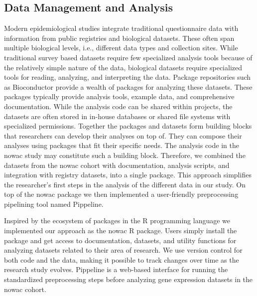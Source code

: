 \subsection{Data Management and Analysis} 
Modern epidemiological studies integrate traditional questionnaire data with
information from public registries and biological datasets. These often span
multiple biological levels, i.e., different data types and collection sites.
While traditional survey based datasets require few specialized analysis tools
because of the relatively simple nature of the data, biological datasets require
specialized tools for reading, analyzing, and interpreting the data. Package
repositories such as Bioconductor\cite{bioconductor} provide a wealth of
packages for analyzing these datasets. These packages typically provide analysis
tools, example data, and comprehensive documentation. While the analysis code
can be shared within projects, the datasets are often stored in in-house
databases or shared file systems with specialized permissions. Together the
packages and datasets form building blocks that researchers can develop their
analyses on top of. They can compose their analyses using packages that fit
their specific needs. The analysis code in the \gls{nowac} study may constitute
such a building block. Therefore, we combined the datasets from the \gls{nowac}
cohort with documentation, analysis scripts, and integration with registry
datasets, into a single package.  This approach simplifies the researcher's
first steps in the analysis of the different data in our study. On top of the
\gls{nowac} package we then implemented a user-friendly preprocessing pipelining
tool named Pippeline. 

Inspired by the ecosystem of packages in the R programming language we
implemented our approach as the \gls{nowac} R package. Users simply install the
package and get access to documentation, datasets, and utility functions for
analyzing datasets related to their area of research. We use version
control for both code and the data, making it possible to track changes over
time as the research study evolves. Pippeline is a web-based interface for
running the standardized preprocessing steps before analyzing gene expression
datasets in the \gls{nowac} cohort. 

